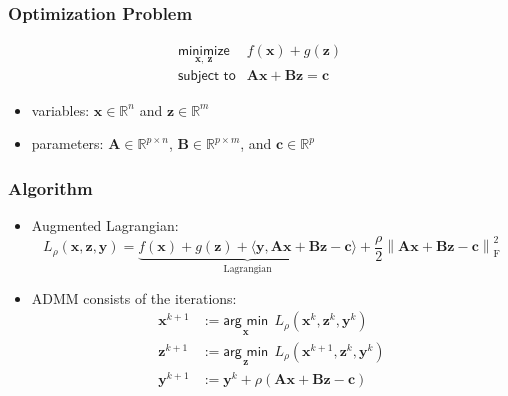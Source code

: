 \documentclass[aspectratio=169]{beamer}
\newcommand{\norm}[1]{\left\lVert#1\right\rVert}
\begin{document}
		\begin{frame}
		  \frametitle{Optimization Problem}
                  \vspace{1cm}
                    {\huge
                  \begin{equation}
                     \begin{array}{ll}
                       \underset{\bm x,~ \bm z}{\textsf{minimize}} & f(\bm x) + g(\bm z) \\
                       \textsf{subject to} & \bm A\bm x + \bm B \bm z = \bm c
                      \end{array}
                 \end{equation}
                    }
                 \begin{itemize}
                 \item variables: $\bm x \in \mathbb{R}^{n}$ and $\bm z \in \mathbb{R}^{m}$
                 \item parameters: $\bm A \in \mathbb{R}^{p\times n}$, $\bm B \in \mathbb{R}^{p\times m}$, and $\bm c \in \mathbb{R}^p$
                 \end{itemize}
		\end{frame}

                \begin{frame}
                  \frametitle{Algorithm}
                  \begin{itemize}
                    \item Augmented Lagrangian:
                      \begin{equation}
                        L_{\rho}(\bm x, \bm z, \bm y) = \underbrace{f(\bm x) + g(\bm z) + \langle \bm y, \bm A\bm x + \bm B \bm z - \bm c \rangle}_{\text{Lagrangian}}
                        + \dfrac{\rho}{2}\norm{\bm A\bm x + \bm B \bm z - \bm c}^2_{\mathrm{F}}
                      \end{equation}
                    \item ADMM consists of the iterations:
                      \begin{align}
                        \bm x^{k+1} & := \underset{\bm x}{\textsf{arg min}}~~ L_{\rho}(\bm x^k, \bm z^k, \bm y^k) \\
                        \bm z^{k+1} & := \underset{\bm z}{\textsf{arg min}}~~ L_{\rho}(\bm x^{k+1}, \bm z^k, \bm y^k) \\
                        \bm y^{k+1} & := \bm y^k + \rho\left(\bm A\bm x + \bm B \bm z - \bm c\right)
                      \end{align}
                  \end{itemize}
                \end{frame}
\end{document}
